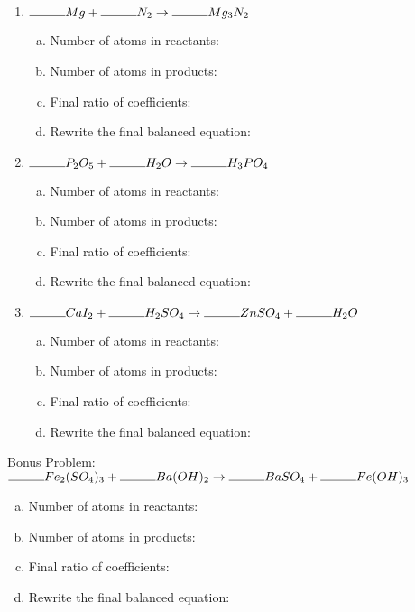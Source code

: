 \documentclass[notitlepage,12pt]{article} %
\begin{document}
\begin{enumerate}
\item $\rule{1cm}{0.4pt}Mg + \rule{1cm}{0.4pt}  N_2 \rightarrow \rule{1cm}{0.4pt} Mg_3N_2$
\begin{enumerate}[a.]
\item Number of atoms in reactants:
\vspace{2cm}
\item Number of atoms in products:
\vspace{2cm}
\item Final ratio of coefficients:
\vspace{2cm}
\item Rewrite the final balanced equation:
\vspace{2cm}
\end{enumerate}

\item $\rule{1cm}{0.4pt} P_2O_5  + \rule{1cm}{0.4pt}  H_2O \rightarrow \rule{1cm}{0.4pt} H_3PO_4$
\begin{enumerate}[a.]
\item Number of atoms in reactants:
\vspace{2cm}
\item Number of atoms in products:
\vspace{2cm}
\item Final ratio of coefficients:
\vspace{2cm}
\item Rewrite the final balanced equation:
\vspace{2cm}
\end{enumerate}

\item $\rule{1cm}{0.4pt} CaI_2+ \rule{1cm}{0.4pt} H_2SO_4 \rightarrow \rule{1cm}{0.4pt} ZnSO_4 +  \rule{1cm}{0.4pt} H_2O$
\begin{enumerate}[a.]
\item Number of atoms in reactants:
\vspace{2cm}
\item Number of atoms in products:
\vspace{2cm}
\item Final ratio of coefficients:
\vspace{2cm}
\item Rewrite the final balanced equation:
\vspace{2cm}
\end{enumerate}


\end{enumerate}

Bonus Problem: 
$\rule{1cm}{0.4pt}Fe_2(SO_4)_3+ \rule{1cm}{0.4pt} Ba(OH)_2 \rightarrow \rule{1cm}{0.4pt} BaSO_4+  \rule{1cm}{0.4pt} Fe(OH)_3$

\begin{enumerate}[a.]
\item Number of atoms in reactants:
\vspace{2cm}
\item Number of atoms in products:
\vspace{2cm}
\item Final ratio of coefficients:
\vspace{2cm}
\item Rewrite the final balanced equation:
\vspace{2cm}
\end{enumerate}
\end{document}
